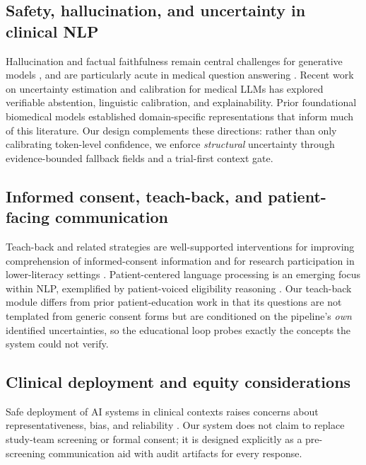 \documentclass[11pt]{article}
\begin{document}
\subsection{Safety, hallucination, and uncertainty in clinical NLP}
Hallucination and factual faithfulness remain central challenges for generative models \citep{ji2023hallucination,maynez2020faithfulness,huang2025survey,min2023factscore}, and are particularly acute in medical question answering \citep{pal2023medhalu,ayers2023comparing,lievin2024can}. Recent work on uncertainty estimation and calibration for medical LLMs \citep{wu2024uncertainty,zhou2025uncertaintyaware,wang2025trustworthy,lucas2024reasoning,kadavath2022know,mielke2022reducing} has explored verifiable abstention, linguistic calibration, and explainability. Prior foundational biomedical models \citep{lee2020biobert,alsentzer2019clinicalbert} established domain-specific representations that inform much of this literature. Our design complements these directions: rather than only calibrating token-level confidence, we enforce \emph{structural} uncertainty through evidence-bounded fallback fields and a trial-first context gate.

\subsection{Informed consent, teach-back, and patient-facing communication}
Teach-back and related strategies are well-supported interventions for improving comprehension of informed-consent information and for research participation in lower-literacy settings \citep{kripalani2008teachback,talevski2020teachback,kadam2017informed,jamerson2023evaluation,tamariz2013improving,glaser2020interventions,burks2019health,ho2017teachback,sudore2009interventions}. Patient-centered language processing is an emerging focus within NLP, exemplified by patient-voiced eligibility reasoning \citep{aguiar2025amieligible,chen2025enhancing}. Our teach-back module differs from prior patient-education work in that its questions are not templated from generic consent forms but are conditioned on the pipeline's \emph{own} identified uncertainties, so the educational loop probes exactly the concepts the system could not verify.

\subsection{Clinical deployment and equity considerations}
Safe deployment of AI systems in clinical contexts raises concerns about representativeness, bias, and reliability \citep{obermeyer2019dissecting,wornow2023shaky,topol2019deep,fda2022diversity,clark2019barriers,weng2017medical,spasic2020clinical}. Our system does not claim to replace study-team screening or formal consent; it is designed explicitly as a pre-screening communication aid with audit artifacts for every response.
\end{document}
